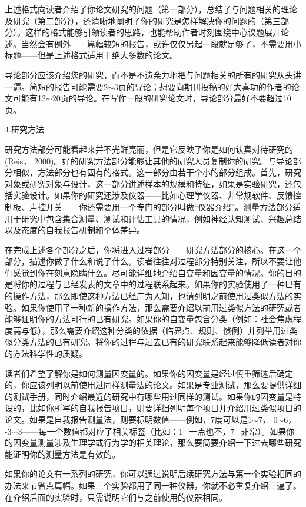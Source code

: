 上述格式向读者介绍了你论文研究的问题（第一部分），总结了与问题相关的理论及研究（第二部分），还清晰地阐明了你的研究是怎样解决你的问题的（第三部分）。这样的格式能够引领读者的思路，也能帮助作者时刻围绕中心议题展开论述。当然会有例外——篇幅较短的报告，或许仅仅另起一段就足够了，不需要用小标题——但是上述格式适用于绝大多数的论文。

导论部分应该介绍您的研究，而不是不遗余力地把与问题相关的所有的研究从头讲一遍。简短的报告可能需要2$\sim$3页的导论；想要向期刊投稿的好大喜功的作者的论文可能有12$\sim$20页的导论。在写作一般的研究论文时，导论部分最好不要超过10页。

{\kaishu 4.研究方法}

研究方法部分可能看起来并不光鲜亮丽，但是它反映了你是如何认真对待研究的(Reis， 2000)。好的研究方法部分能够让其他的研究人员复制你的研究。与导论部分相似，方法部分也有固有的格式。这一部分由若干个小的部分组成。首先，研究对象或研究对象与设计，这一部分讲述样本的规模和特征，如果是实验研究，还包括实验设计。如果你的研究还涉及仪器——比如心理学仪器、非常规软件、反馈控制板、声控开关——你还需要用一个专门的部分叫做“仪器介绍”。测量方法部分适用于研究中包含集合测量、测试和评估工具的情况，例如神经认知测试、兴趣总结以及态度的自我报告机制和个体差异。

在完成上述各个部分之后，你将进入过程部分——研究方法部分的核心。在这一个部分，描述你做了什么和说了什么。读者往往对过程部分特别关注，所以不要让他们感觉到你在刻意隐瞒什么。尽可能详细地介绍自变量和因变量的情况。你的目的是将你的过程与已经发表的文章中的过程联系起来。如果你的实验使用了一种巳有的操作方法，那么即使这种方法已经广为人知，也请列明之前使用过类似方法的实验。如果你使用了一种新的操作方法，那么需要介绍以前用过类似方法的研究或者能够证明你的方法可行的已有研究。如果你的自变量包含分类（例如：社会焦虑程度高与低），那么需要介绍这种分类的依据（临界点、规则、惯例）并列举用过类似分类方法的已有研究。将你的过程与过去已有的研究联系起来能够降低读者对你的方法科学性的质疑。

读者们希望了解你是如何测量因变量的。如果你的因变量是经过慎重筛选后确定的，你应该列明以前使用过同样测量法的论文。如果是专业测试，那么要提供详细的测试手册，同时介绍最近的研究中有哪些用过同样的测试。如果你的因变量是特设的，比如你所写的自我报告项目，则要详细列明每个项目并介绍用过类似项目的论文。如果是自我报告测量法，则要标明数值——例如，7度可以是1$\sim$7， 0$\sim$6， -3$\sim$3——每一个数值都对应了相关标签（比如：1=一点也不，7=非常）。如果你的因变量测量涉及生理学或行为学的相关理论，那么要简要介绍一下过去哪些研究能证明你的测量方法是有效的。

如果你的论文有一系列的研究，你可以通过说明后续研究方法与第一个实验相同的办法来节省点篇幅。如果三个实验都用了同一种仪器，你就不必重复介绍三遍了。在介绍后面的实验时，只需说明它们与之前使用的仪器相同。

